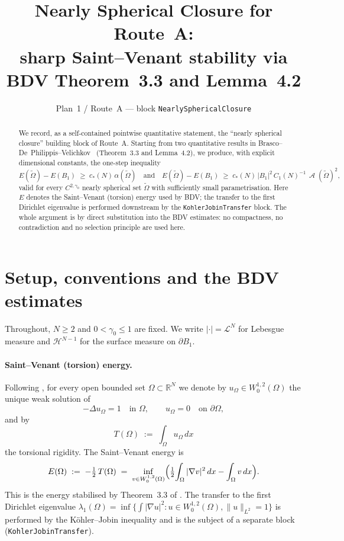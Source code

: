 \documentclass[11pt]{article}
\title{Nearly Spherical Closure for Route~A:\\
sharp Saint--Venant stability via BDV Theorem~3.3 and Lemma~4.2}
\author{Plan~1 / Route~A --- block \texttt{NearlySphericalClosure}}
\date{}
\theoremstyle{definition}
\DeclareMathOperator{\Asym}{\mathcal{A}}
\newcommand{\bdy}{\partial}
\newcommand{\Rn}{\mathbb{R}^N}
\newcommand{\Ot}{\widetilde{\Omega}}
\newcommand{\HN}{\mathcal{H}^{N-1}}
\begin{document}
\maketitle

\begin{abstract}
We record, as a self-contained pointwise quantitative statement, the
``nearly spherical closure'' building block of Route~A. Starting from two
quantitative results in Brasco--De~Philippis--Velichkov~\cite{BDV2013}
(Theorem~3.3 and Lemma~4.2), we produce, with explicit dimensional
constants, the one-step inequality
\[
E(\Ot)-E(B_1)\;\ge\; c_*(N)\,\alpha(\Ot)
\quad\text{and}\quad
E(\Ot)-E(B_1)\;\ge\;c_*(N)\,|B_1|^{2}\,C_1(N)^{-1}\,\Asym(\Ot)^{2},
\]
valid for every $C^{2,\gamma_0}$ nearly spherical set $\Ot$ with
sufficiently small parametrisation. Here $E$ denotes the Saint--Venant
(torsion) energy used by BDV; the transfer to the first Dirichlet
eigenvalue is performed downstream by the \texttt{KohlerJobinTransfer}
block. The whole argument is by direct substitution into the BDV
estimates: no compactness, no contradiction and no selection principle
are used here.
\end{abstract}

\section{Setup, conventions and the BDV estimates}\label{sec:setup}

Throughout, $N\ge 2$ and $0<\gamma_0\le 1$ are fixed. We write
$|\cdot|=\mathcal{L}^N$ for Lebesgue measure and $\HN$ for the surface
measure on $\bdy B_1$.

\paragraph{Saint--Venant (torsion) energy.}
Following \cite[\S2]{BDV2013}, for every open bounded set
$\Omega\subset\Rn$ we denote by $u_\Omega\in W^{1,2}_0(\Omega)$ the unique
weak solution of
\[
-\Delta u_\Omega=1\quad\text{in }\Omega,\qquad u_\Omega=0\quad\text{on }
\bdy\Omega,
\]
and by
\[
T(\Omega)\;:=\;\int_\Omega u_\Omega\,dx
\]
the torsional rigidity. The Saint--Venant energy is
\begin{equation}\label{eq:Edef}
E(\Omega)\;:=\;-\tfrac12\,T(\Omega)
\;=\;\inf_{v\in W^{1,2}_0(\Omega)}
\Bigl(\tfrac12\!\int_\Omega|\nabla v|^2\,dx-\int_\Omega v\,dx\Bigr).
\end{equation}
This is the energy stabilised by Theorem~3.3 of \cite{BDV2013}. The
transfer to the first Dirichlet eigenvalue
$\lambda_1(\Omega)=\inf\{\int|\nabla u|^2:u\in W^{1,2}_0(\Omega),
\|u\|_{L^2}=1\}$ is performed by the K\"ohler--Jobin inequality and is
the subject of a separate block (\texttt{KohlerJobinTransfer}).
\end{document}
